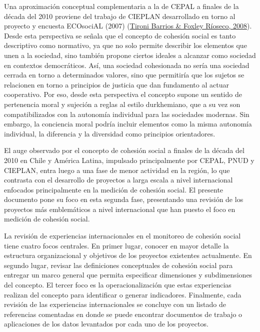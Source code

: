 \documentclass[
  12pt,
]{book}
\begin{document}
Una aproximación conceptual complementaria a la de CEPAL a finales de la década del 2010 proviene del trabajo de CIEPLAN desarrollado en torno al proyecto y encuesta ECOsociAL (2007) (\protect\hyperlink{ref-tironibarrios_Redes_2008}{Tironi Barrios \& Foxley Ríoseco, 2008}). Desde esta perspectiva se señala que el concepto de cohesión social es tanto descriptivo como normativo, ya que no solo permite describir los elementos que unen a la sociedad, sino también propone ciertos ideales a alcanzar como sociedad en contextos democráticos. Así, una sociedad cohesionada no sería una sociedad cerrada en torno a determinados valores, sino que permitiría que los sujetos se relacionen en torno a principios de justicia que dan fundamento al actuar cooperativo. Por eso, desde esta perspectiva el concepto supone un sentido de pertenencia moral y sujeción a reglas al estilo durkhemiano, que a su vez son compatibilizados con la autonomía individual para las sociedades modernas. Sin embargo, la conciencia moral podría incluir elementos como la misma autonomía individual, la diferencia y la diversidad como principios orientadores.

El auge observado por el concepto de cohesión social a finales de la década del 2010 en Chile y América Latina, impulsado principalmente por CEPAL, PNUD y CIEPLAN, entra luego a una fase de menor actividad en la región, lo que contrasta con el desarrollo de proyectos a larga escala a nivel internacional enfocados principalmente en la medición de cohesión social. El presente documento pone su foco en esta segunda fase, presentando una revisión de los proyectos más emblemáticos a nivel internacional que han puesto el foco en medición de cohesión social.

La revisión de experiencias internacionales en el monitoreo de cohesión social tiene cuatro focos centrales. En primer lugar, conocer en mayor detalle la estructura organizacional y objetivos de los proyectos existentes actualmente. En segundo lugar, revisar las definiciones conceptuales de cohesión social para entregar un marco general que permita especificar dimensiones y subdimensiones del concepto. El tercer foco es la operacionalización que estas experiencias realizan del concepto para identificar o generar indicadores. Finalmente, cada revisión de las experiencias internacionales se concluye con un listado de referencias comentadas en donde se puede encontrar documentos de trabajo o aplicaciones de los datos levantados por cada uno de los proyectos.
\end{document}
